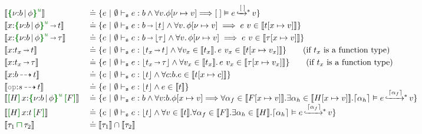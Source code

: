 \begin{figure}[t!]
{\begin{align*}
  &\denot{ \urt{b}{\phi} } &&\doteq \{ e ~|~ \emptyset
                                       \basicvdash e : b \land
                                       \forall v. \phi[\nu\mapsto v] \impl \msteptr{[\;]}{e}{[\;]}{v}  \}
  \\ &\denot{ x{:}\urt{b}{\phi} \sarr t } &&\doteq \{ e ~|~ \emptyset \basicvdash e : b\sarr\eraserf{t} \land
                                           \forall v.\, \phi[\nu\mapsto v] \implies e\ v \in  \denot{ t[x \mapsto v ] } \}
  \\ &\denot{ x{:}\urt{b}{\phi}\sarr\tau } &&\doteq \{ e ~|~ \emptyset \basicvdash e : b\sarr\eraserf{\tau} \land
                                           \forall v.\, \phi[\nu\mapsto v] \implies e\ v \in  \denot{ \tau[x\mapsto v ] } \}
  \\ &\denot{ x{:}t_x \sarr t } &&\doteq \{ e ~|~ \emptyset \basicvdash e : \eraserf{t_x\sarr t} \land
                                           \forall v_x \in \denot{t_x}.\, e\ v_x \in  \denot{ t[x \mapsto v_x ] } \} \qquad \text{(if $t_x$ is a function type)}
  \\ &\denot{ x{:}t_x\sarr\tau } &&\doteq \{ e ~|~ \emptyset \basicvdash e : \eraserf{t_x\sarr\tau} \land
                                           \forall v_x \in \denot{t_x}.\, e\ v_x \in  \denot{ \tau[x \mapsto v_x ] } \} \qquad \text{(if $t_x$ is a function type)}
  \\ &\denot{ x{:}b\garr t } &&\doteq \{ e ~|~ 
    \emptyset \basicvdash e : \eraserf{t} \land 
    \forall c{:}b. e \in  \denot{ t[x\mapsto c ] } \}
  \\ &\denot{ \effGray{op}{:}s\garr t } &&\doteq \{ e ~|~ 
    \emptyset \basicvdash e : \eraserf{t} \land 
    e\in\denot{ t } \}
  \\[-.8em] &\denot{\uhat{H}{x{:}\urt{b}{\phi}}{F}} &&\doteq \{e ~|~ \emptyset \basicvdash e : b \land \forall v{:}b. \phi[x\mapsto v] \impl \forall \alpha_f \in \denot{F[x\mapsto v]}. \exists \alpha_h \in\denot{H[x\mapsto v]}. \msteptr{\eraseGhost{\alpha_h}}{e}{\eraseGhost{\alpha_f}}{v} \}
  \\[-.4em] &\denot{\uhat{H}{x{:}t}{F}} &&\doteq \{e ~|~ \emptyset \basicvdash e : \eraserf{t} \land \forall v\in\denot{t}. \forall \alpha_f \in \denot{F}. \exists \alpha_h \in\denot{H}. \msteptr{\eraseGhost{\alpha_h}}{e}{\eraseGhost{\alpha_f}}{v} \}
  \\ &\denot{ \tau_1 \interty \tau_2 } &&\doteq \denot{\tau_1} \cap \denot{\tau_2}
\end{align*}
}
\end{figure}
